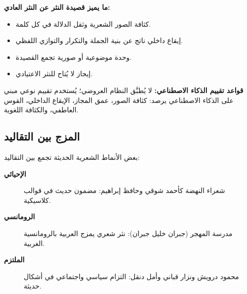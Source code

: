 \begin{otherlanguage}{arabic}
\textbf{ما يميز قصيدة النثر عن النثر العادي:}
\begin{itemize}
  \item كثافة الصور الشعرية وثقل الدلالة في كل كلمة.
  \item إيقاع داخلي ناتج عن بنية الجملة والتكرار والتوازي اللفظي.
  \item وحدة موضوعية أو صورية تجمع القصيدة.
  \item إيجاز لا يُتاح للنثر الاعتيادي.
\end{itemize}

\textbf{قواعد تقييم الذكاء الاصطناعي:} لا يُطبَّق النظام العروضي؛ يُستخدم تقييم نوعي مبني على الذكاء الاصطناعي يرصد: كثافة الصور، عمق المجاز، الإيقاع الداخلي، القوس العاطفي، والكثافة اللغوية.

\subsection*{المزج بين التقاليد}

بعض الأنماط الشعرية الحديثة تجمع بين التقاليد:
\begin{description}
  \item[\textbf{الإحيائي}] شعراء النهضة كأحمد شوقي وحافظ إبراهيم: مضمون حديث في قوالب كلاسيكية.
  \item[\textbf{الرومانسي}] مدرسة المهجر (جبران خليل جبران): نثر شعري يمزج العربية بالرومانسية الغربية.
  \item[\textbf{الملتزم}] محمود درويش ونزار قباني وأمل دنقل: التزام سياسي واجتماعي في أشكال حديثة.
\end{description}

\end{otherlanguage}
